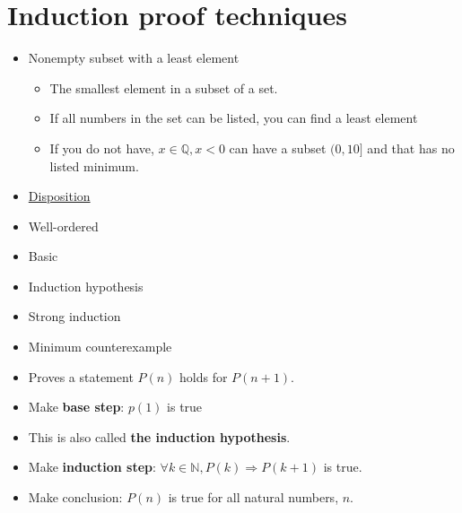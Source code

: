 \documentclass[english,10pt,a4paper]{article}
\begin{document}
\newpage
\section{Induction proof techniques}


\begin{minipage}{0.70\linewidth}
\begin{theo} 
\begin{itemize}
\item Nonempty subset with a least element
\begin{itemize}
\item The smallest element in a subset of a set.
\item If all numbers in the set can be listed, you can find a least element
\item If you do not have, $x \in \mathbb{Q}, x < 0$ can have a subset $(0, 10]$ and that has no listed minimum.

\end{itemize}
\end{itemize}
\end{theo}
\end{minipage}
\hspace{0.1cm}
\begin{minipage}{0.25\linewidth}
\begin{itemize}
\item[] \underline{Disposition}
\item Well-ordered
\item Basic
\item Induction hypothesis
\item Strong induction
\item Minimum counterexample
\end{itemize}
\end{minipage}



\begin{theo}[Basic] 
\begin{itemize}
\item Proves a statement $P(n)$ holds for $P(n+1)$.
\item Make \textbf{base step}: $p(1)$ is true
\item[] This is also called \textbf{the induction hypothesis}.
\item Make \textbf{induction step}: $\forall k \in \mathbb{N}, P(k) \Rightarrow P(k+1)$ is true.
\item Make conclusion: $P(n)$ is true for all natural numbers, $n$.
\end{itemize}
\end{theo}
\end{document}
